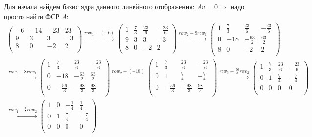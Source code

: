 \documentclass[a4paper,11pt]{article}
\begin{document}
Для начала найдем базис ядра данного линейного отображения: $ Av = 0 \Rightarrow$ надо просто найти ФСР $ A $: 
\begin{gather*}
\begin{pmatrix}
-6 & -14 & -23 & 23 \\[2pt]
9 & 3 & 3 & -3 \\[2pt]
8 & 0 & -2 & 2 \\[2pt]
\end{pmatrix}
\stackrel{ row_{1} \div (-6) }{\longrightarrow}
\begin{pmatrix}
1 & \frac{7}{3} & \frac{23}{6} & -\frac{23}{6} \\[2pt]
9 & 3 & 3 & -3 \\[2pt]
8 & 0 & -2 & 2 \\[2pt]
\end{pmatrix}
\stackrel{ row_{2} - 9row_{1} }{\longrightarrow}
\begin{pmatrix}
1 & \frac{7}{3} & \frac{23}{6} & -\frac{23}{6} \\[2pt]
0 & -18 & -\frac{63}{2} & \frac{63}{2} \\[2pt]
8 & 0 & -2 & 2 \\[2pt]
\end{pmatrix}
\\[3pt]
\stackrel{ row_{3} - 8row_{1} }{\longrightarrow}
\begin{pmatrix}
1 & \frac{7}{3} & \frac{23}{6} & -\frac{23}{6} \\[2pt]
0 & -18 & -\frac{63}{2} & \frac{63}{2} \\[2pt]
0 & -\frac{56}{3} & -\frac{98}{3} & \frac{98}{3} \\[2pt]
\end{pmatrix}
\stackrel{ row_{2} \div (-18) }{\longrightarrow}
\begin{pmatrix}
1 & \frac{7}{3} & \frac{23}{6} & -\frac{23}{6} \\[2pt]
0 & 1 & \frac{7}{4} & -\frac{7}{4} \\[2pt]
0 & -\frac{56}{3} & -\frac{98}{3} & \frac{98}{3} \\[2pt]
\end{pmatrix}
\stackrel{ row_{3} + \frac{56}{3}row_{2} }{\longrightarrow}
\begin{pmatrix}
1 & \frac{7}{3} & \frac{23}{6} & -\frac{23}{6} \\[2pt]
0 & 1 & \frac{7}{4} & -\frac{7}{4} \\[2pt]
0 & 0 & 0 & 0 \\[2pt]
\end{pmatrix}
\\[3pt]
\stackrel{ row_{1} - \frac{7}{3}row_{2} }{\longrightarrow}
\begin{pmatrix}
1 & 0 & -\frac{1}{4} & \frac{1}{4} \\[2pt]
0 & 1 & \frac{7}{4} & -\frac{7}{4} \\[2pt]
0 & 0 & 0 & 0 \\[2pt]
\end{pmatrix}
\end{gather*}
\end{document}
